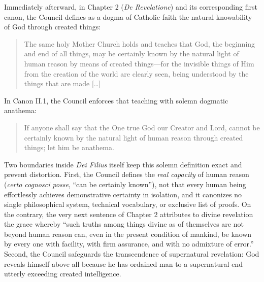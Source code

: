 Immediately afterward, in Chapter 2 (\emph{De Revelatione}) and its corresponding first canon, the Council defines as a dogma of Catholic faith the natural knowability of God through created things:

\begin{quote}
The same holy Mother Church holds and teaches that God, the beginning and end of all things, may be certainly known by the natural light of human reason by means of created things---for the invisible things of Him from the creation of the world are clearly seen, being understood by the things that are made [\ldots]
\end{quote}

In Canon II.1, the Council enforces that teaching with solemn dogmatic anathema:

\begin{quote}
If anyone shall say that the One true God our Creator and Lord, cannot be certainly known by the natural light of human reason through created things; let him be anathema.
\end{quote}

Two boundaries inside \emph{Dei Filius} itself keep this solemn definition exact and prevent distortion. First, the Council defines the \emph{real capacity} of human reason (\emph{certo cognosci posse}, ``can be certainly known''), not that every human being effortlessly achieves demonstrative certainty in isolation, and it canonizes no single philosophical system, technical vocabulary, or exclusive list of proofs. On the contrary, the very next sentence of Chapter 2 attributes to divine revelation the grace whereby ``such truths among things divine as of themselves are not beyond human reason can, even in the present condition of mankind, be known by every one with facility, with firm assurance, and with no admixture of error.'' Second, the Council safeguards the transcendence of supernatural revelation: God reveals himself above all because he has ordained man to a supernatural end utterly exceeding created intelligence.

